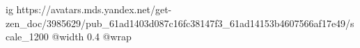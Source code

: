  
 
 
 
 

\ifcmt
  ig https://avatars.mds.yandex.net/get-zen_doc/3985629/pub_61ad1403d087c16fc38147f3_61ad14153b4607566af17e49/scale_1200
  @width 0.4
  @wrap 
\fi
